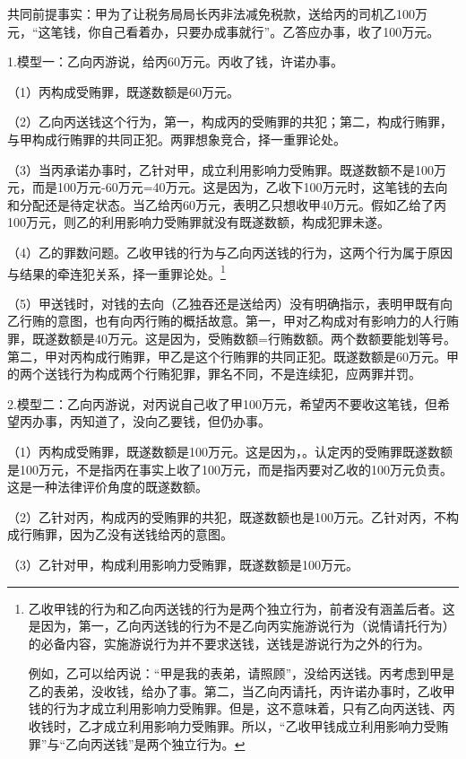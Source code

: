 共同前提事实：甲为了让税务局局长丙非法减免税款，送给丙的司机乙100万元，“这笔钱，你自己看着办，只要办成事就行”。乙答应办事，收了100万元。

1.模型一：乙向丙游说，给丙60万元。丙收了钱，许诺办事。

（1）丙构成受贿罪，既遂数额是60万元。

（2）乙向丙送钱这个行为，第一，构成丙的受贿罪的共犯；第二，构成行贿罪，与甲构成行贿罪的共同正犯。两罪想象竞合，择一重罪论处。

（3）当丙承诺办事时，乙针对甲，成立利用影响力受贿罪。既遂数额不是100万元，而是100万元-60万元=40万元。这是因为，乙收下100万元时，这笔钱的去向和分配还是待定状态。当乙给丙60万元，表明乙只想收甲40万元。假如乙给了丙100万元，则乙的利用影响力受贿罪就没有既遂数额，构成犯罪未遂。

（4）乙的罪数问题。乙收甲钱的行为与乙向丙送钱的行为，这两个行为属于原因与结果的牵连犯关系，择一重罪论处。\footnote{乙收甲钱的行为和乙向丙送钱的行为是两个独立行为，前者没有涵盖后者。这是因为，第一，乙向丙送钱的行为不是乙向丙实施游说行为（说情请托行为）的必备内容，实施游说行为并不要求送钱，送钱是游说行为之外的行为。

例如，乙可以给丙说：“甲是我的表弟，请照顾”，没给丙送钱。丙考虑到甲是乙的表弟，没收钱，给办了事。第二，当乙向丙请托，丙许诺办事时，乙收甲钱的行为才成立利用影响力受贿罪。但是，这不意味着，只有乙向丙送钱、丙收钱时，乙才成立利用影响力受贿罪。所以，“乙收甲钱成立利用影响力受贿罪”与“乙向丙送钱”是两个独立行为。}

（5）甲送钱时，对钱的去向（乙独吞还是送给丙）没有明确指示，表明甲既有向乙行贿的意图，也有向丙行贿的概括故意。第一，甲对乙构成对有影响力的人行贿罪，既遂数额是40万元。这是因为，受贿数额=行贿数额。两个数额要能划等号。第二，甲对丙构成行贿罪，甲乙是这个行贿罪的共同正犯。既遂数额是60万元。甲的两个送钱行为构成两个行贿犯罪，罪名不同，不是连续犯，应两罪并罚。

2.模型二：乙向丙游说，对丙说自己收了甲100万元，希望丙不要收这笔钱，但希望丙办事，丙知道了，没向乙要钱，但仍办事。

（1）丙构成受贿罪，既遂数额是100万元。这是因为，。认定丙的受贿罪既遂数额是100万元，不是指丙在事实上收了100万元，而是指丙要对乙收的100万元负责。这是一种法律评价角度的既遂数额。

（2）乙针对丙，构成丙的受贿罪的共犯，既遂数额也是100万元。乙针对丙，不构成行贿罪，因为乙没有送钱给丙的意图。

（3）乙针对甲，构成利用影响力受贿罪，既遂数额是100万元。

